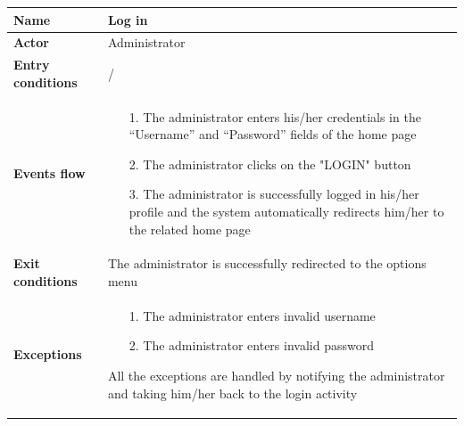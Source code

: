 \begin{table}[]
\begin{adjustbox}{width=\textwidth}
\footnotesize
\begin{tabular}{|p{}|p{}|}
\hline
\textbf{Name}             &  Log in\\ \hline
\textbf{Actor}            &  Administrator\\ \hline
\textbf{Entry conditions} &  /\\ \hline
\textbf{Events flow}      &
	\begin{itemize}
		\item[1.] The administrator enters his/her credentials in the “Username” and “Password” fields of the home page
		\item[2.] The administrator clicks on the "LOGIN" button
		\item[3.] The administrator is successfully logged in his/her profile and the system automatically redirects him/her to the related home page
	\end{itemize}\\ \hline
\textbf{Exit conditions}  &  The administrator is successfully redirected to the options menu\\ \hline
\textbf{Exceptions}       &
	\begin{itemize}
		\item[1.] The administrator enters invalid username
		\item[2.] The administrator enters invalid password
	\end{itemize}
	All the exceptions are handled by notifying the administrator and taking him/her back to the login 	activity\\ \hline
\end{tabular}
\end{adjustbox}
\end{table}

